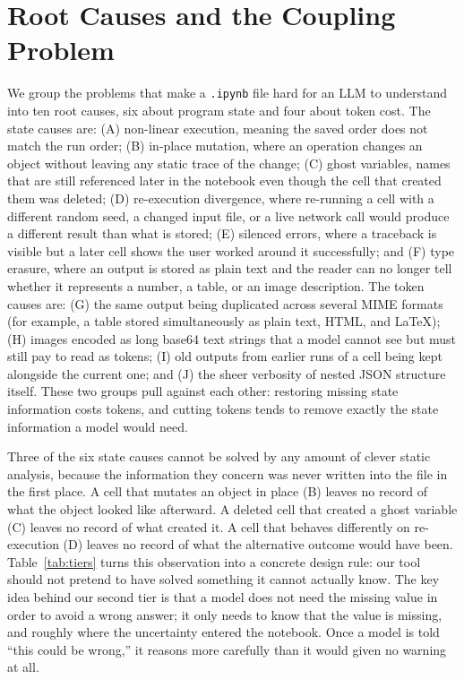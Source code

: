 \documentclass[11pt]{article}
\begin{document}
\section{Root Causes and the Coupling Problem}
\label{sec:causes}
We group the problems that make a \texttt{.ipynb} file hard for an LLM to
understand into ten root causes, six about program state and four about
token cost. The state causes are: (A) non-linear execution, meaning the
saved order does not match the run order; (B) in-place mutation, where an
operation changes an object without leaving any static trace of the
change; (C) ghost variables, names that are still referenced later in the
notebook even though the cell that created them was deleted; (D)
re-execution divergence, where re-running a cell with a different random
seed, a changed input file, or a live network call would produce a
different result than what is stored; (E) silenced errors, where a
traceback is visible but a later cell shows the user worked around it
successfully; and (F) type erasure, where an output is stored as plain
text and the reader can no longer tell whether it represents a number, a
table, or an image description. The token causes are: (G) the same output
being duplicated across several MIME formats (for example, a table stored
simultaneously as plain text, HTML, and LaTeX); (H) images encoded as
long base64 text strings that a model cannot see but must still pay to
read as tokens; (I) old outputs from earlier runs of a cell being kept
alongside the current one; and (J) the sheer verbosity of nested JSON
structure itself. These two groups pull against each other: restoring
missing state information costs tokens, and cutting tokens tends to
remove exactly the state information a model would need.

Three of the six state causes cannot be solved by any amount of clever
static analysis, because the information they concern was never written
into the file in the first place. A cell that mutates an object in place
(B) leaves no record of what the object looked like afterward. A deleted
cell that created a ghost variable (C) leaves no record of what created
it. A cell that behaves differently on re-execution (D) leaves no record
of what the alternative outcome would have been. Table~\ref{tab:tiers}
turns this observation into a concrete design rule: our tool should not
pretend to have solved something it cannot actually know. The key idea
behind our second tier is that a model does not need the missing value in
order to avoid a wrong answer; it only needs to know that the value is
missing, and roughly where the uncertainty entered the notebook. Once a
model is told ``this could be wrong,'' it reasons more carefully than it
would given no warning at all.
\end{document}
